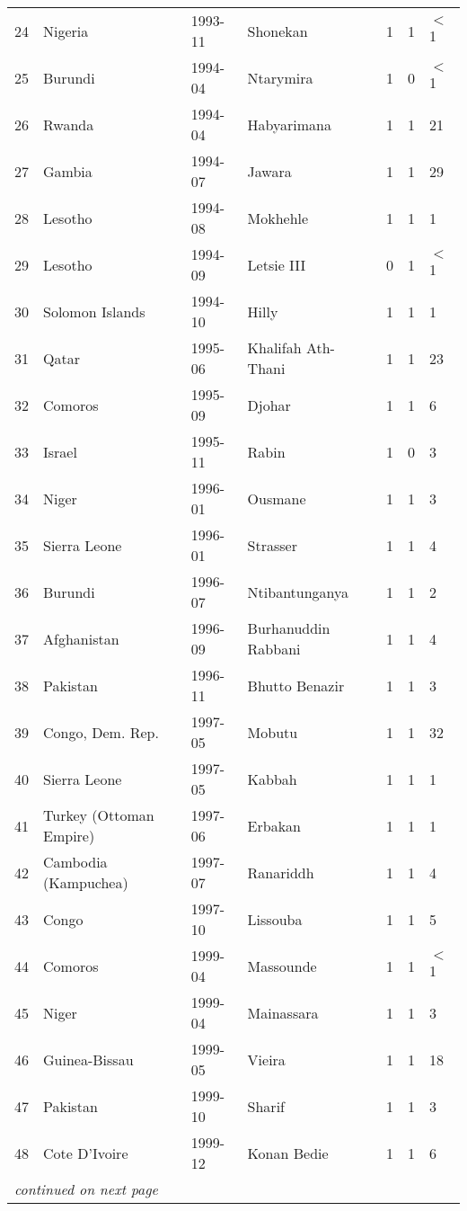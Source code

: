 \documentclass[pdftex,11pt]{article}
\begin{document}
\begin{table*}[ht]
\begin{tabular}{rlllrrl}
  24 & Nigeria & 1993-11 & Shonekan & 1 & 1 & $<$1 \\ 
  25 & Burundi & 1994-04 & Ntarymira & 1 & 0 & $<$1 \\ 
  26 & Rwanda & 1994-04 & Habyarimana & 1 & 1 & 21 \\ 
  27 & Gambia & 1994-07 & Jawara & 1 & 1 & 29 \\ 
  28 & Lesotho & 1994-08 & Mokhehle & 1 & 1 & 1 \\ 
  29 & Lesotho & 1994-09 & Letsie III & 0 & 1 & $<$1 \\ 
  30 & Solomon Islands & 1994-10 & Hilly & 1 & 1 & 1 \\ 
  31 & Qatar & 1995-06 & Khalifah Ath-Thani & 1 & 1 & 23 \\ 
  32 & Comoros & 1995-09 & Djohar & 1 & 1 & 6 \\ 
  33 & Israel & 1995-11 & Rabin & 1 & 0 & 3 \\ 
  34 & Niger & 1996-01 & Ousmane & 1 & 1 & 3 \\ 
  35 & Sierra Leone & 1996-01 & Strasser & 1 & 1 & 4 \\ 
  36 & Burundi & 1996-07 & Ntibantunganya & 1 & 1 & 2 \\ 
  37 & Afghanistan & 1996-09 & Burhanuddin Rabbani & 1 & 1 & 4 \\ 
  38 & Pakistan & 1996-11 & Bhutto Benazir & 1 & 1 & 3 \\ 
  39 & Congo, Dem. Rep. & 1997-05 & Mobutu & 1 & 1 & 32 \\ 
  40 & Sierra Leone & 1997-05 & Kabbah & 1 & 1 & 1 \\ 
  41 & Turkey (Ottoman Empire) & 1997-06 & Erbakan & 1 & 1 & 1 \\ 
  42 & Cambodia (Kampuchea) & 1997-07 & Ranariddh & 1 & 1 & 4 \\ 
  43 & Congo & 1997-10 & Lissouba & 1 & 1 & 5 \\ 
  44 & Comoros & 1999-04 & Massounde & 1 & 1 & $<$1 \\ 
  45 & Niger & 1999-04 & Mainassara & 1 & 1 & 3 \\ 
  46 & Guinea-Bissau & 1999-05 & Vieira & 1 & 1 & 18 \\ 
  47 & Pakistan & 1999-10 & Sharif & 1 & 1 & 3 \\ 
  48 & Cote D'Ivoire & 1999-12 & Konan Bedie & 1 & 1 & 6 \\ 
  \midrule
  \multicolumn{7}{l}{\textit{continued on next page}} 
\end{tabular}
\end{table*}
\end{document}
